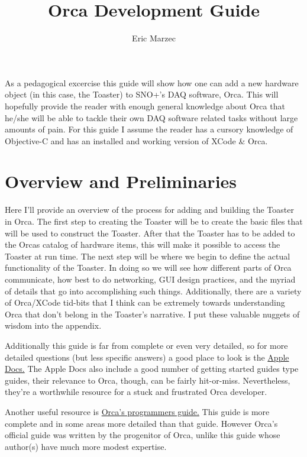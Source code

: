 \documentclass[12pt,a4paper]{article}
\author{Eric Marzec}
\title{Orca Development Guide}
\begin{document}
As a pedagogical excercise this guide will show how one can add a new hardware object (in this case, the
 Toaster) to SNO+'s DAQ software, Orca. This will hopefully provide the reader with enough general
  knowledge about Orca that he/she will be able to tackle their own DAQ software related tasks without large
   amounts of pain. For this guide I assume the reader has a cursory knowledge of Objective-C and has an
    installed and working version of XCode \& Orca. 
\\
\section{Overview and Preliminaries}
Here I'll provide an overview of the process for adding and building the Toaster in Orca.
The first step to creating the Toaster will be to create the basic files that will be used to construct the Toaster. 
After that the Toaster has to be added to the Orcas catalog of hardware items,
this will make it possible to access the Toaster at run time.
The next step will be where we begin to define the actual functionality of the Toaster.
In doing so we will see how different parts of Orca communicate, how best to do networking, GUI design practices, and the myriad of details that go into accomplishing such things.
Additionally, there are a variety of Orca/XCode tid-bits that I think can be extremely towards understanding Orca that don't belong in the Toaster's narrative.
 I put these valuable nuggets of wisdom into the appendix.


Additionally this guide is far from complete or even very detailed, so for more detailed questions (but less specific answers) a good place to look is the \href{https://developer.apple.com/library/mac/navigation/}{ Apple Docs.} The Apple Docs also include a good number of getting started guides type guides, their relevance to Orca, though, can be fairly hit-or-miss.
 Nevertheless, they're a worthwhile resource for a stuck and frustrated Orca developer.
 
 Another useful resource is \href{http://orca.physics.unc.edu/Programming/Index.html}{Orca's programmers guide.}
 This guide is more complete and in some areas more detailed than that guide.
   However Orca's official guide was written by the progenitor of Orca, unlike this guide whose author(s) have much more modest expertise. 
   
\end{document}
